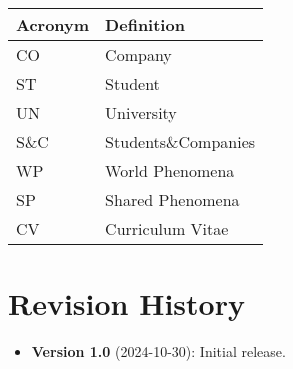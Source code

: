 \begin{table}[H]
    \centering
    \begin{longtable}{|l|p{}|}
        \hline
        \textbf{Acronym} & \textbf{Definition} \\
        \hline \hline
        CO               & Company             \\
        \hline
        ST               & Student             \\
        \hline
        UN               & University          \\
        \hline
        S\&C             & Students\&Companies \\
        \hline
        WP               & World Phenomena     \\
        \hline
        SP               & Shared Phenomena    \\
        \hline
        CV               & Curriculum Vitae    \\
        \hline
    \end{longtable}
\end{table}

\section{Revision History}
\label{sec:revision-history}%

\begin{itemize}
    \item \textbf{Version 1.0} (2024-10-30): Initial release.
\end{itemize}
